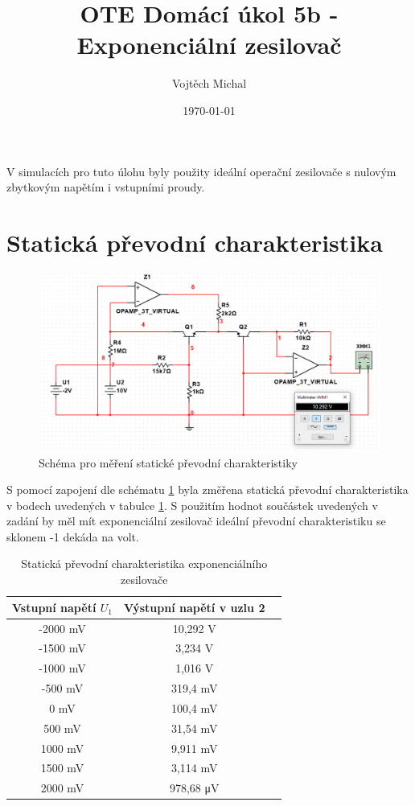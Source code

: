 \documentclass[twoside]{article}
\title{OTE Domácí úkol 5b - Exponenciální zesilovač}
\author{Vojtěch Michal}
\date{\today}
\begin{document}
\maketitle

V simulacích pro tuto úlohu byly použity ideální operační zesilovače s nulovým 
zbytkovým napětím i vstupními proudy.

\section{Statická převodní charakteristika}

\begin{figure}[h!]
    \centering
    \includegraphics[width=0.65\linewidth]{staticka_schema.png}
    \caption{Schéma pro měření statické převodní charakteristiky}
    \label{fig:staticka_schema}
\end{figure}

S pomocí zapojení dle schématu \ref{fig:staticka_schema} byla změřena statická převodní charakteristika
v bodech uvedených v tabulce \ref{table:prevodni}. S použitím hodnot součástek uvedených v zadání
by měl mít exponenciální zesilovač ideální převodní charakteristiku se sklonem -1 dekáda na volt.

\begin{table}[h!]
    \centering
    \begin{tabular}{c|c|c}
        Vstupní napětí $U_1$ & Výstupní napětí v uzlu 2 \\ \hline
        -2000 mV & 10,292 V  \\
        -1500 mV & 3,234 V \\  
        -1000 mV & 1,016 V \\    
        -500 mV & 319,4 mV \\ 
        0 mV & 100,4 mV \\ 
         500 mV & 31,54 mV \\  
        1000 mV & 9,911 mV \\  
        1500 mV & 3,114 mV \\   
        2000 mV & 978,68 \si{\micro\volt}    
    \end{tabular}
    \caption{Statická převodní charakteristika exponenciálního zesilovače}
    \label{table:prevodni}
\end{table}
\end{document}
